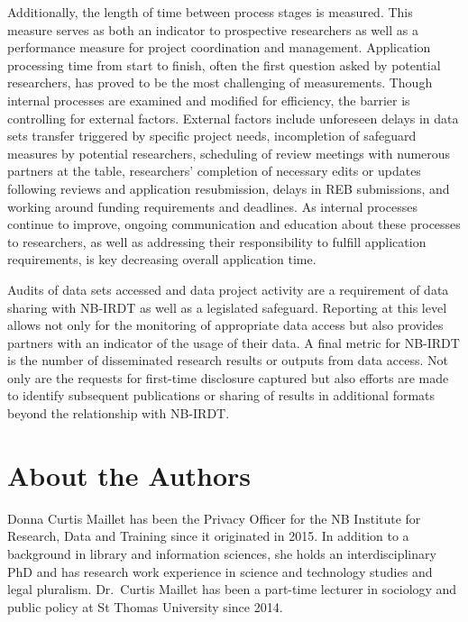 \documentclass[
]{book}
\begin{document}
Additionally, the length of time between process stages is measured. This measure serves as both an indicator to prospective researchers as well as a performance measure for project coordination and management. Application processing time from start to finish, often the first question asked by potential researchers, has proved to be the most challenging of measurements. Though internal processes are examined and modified for efficiency, the barrier is controlling for external factors. External factors include unforeseen delays in data sets transfer triggered by specific project needs, incompletion of safeguard measures by potential researchers, scheduling of review meetings with numerous partners at the table, researchers' completion of necessary edits or updates following reviews and application resubmission, delays in REB submissions, and working around funding requirements and deadlines. As internal processes continue to improve, ongoing communication and education about these processes to researchers, as well as addressing their responsibility to fulfill application requirements, is key decreasing overall application time.

Audits of data sets accessed and data project activity are a requirement of data sharing with NB-IRDT as well as a legislated safeguard. Reporting at this level allows not only for the monitoring of appropriate data access but also provides partners with an indicator of the usage of their data. A final metric for NB-IRDT is the number of disseminated research results or outputs from data access. Not only are the requests for first-time disclosure captured but also efforts are made to identify subsequent publications or sharing of results in additional formats beyond the relationship with NB-IRDT.

\hypertarget{about-the-authors-2}{%
\section*{About the Authors}\label{about-the-authors-2}}

Donna Curtis Maillet has been the Privacy Officer for the NB Institute for Research, Data and Training since it originated in 2015. In addition to a background in library and information sciences, she holds an interdisciplinary PhD and has research work experience in science and technology studies and legal pluralism. Dr.~Curtis Maillet has been a part-time lecturer in sociology and public policy at St Thomas University since 2014.
\end{document}

